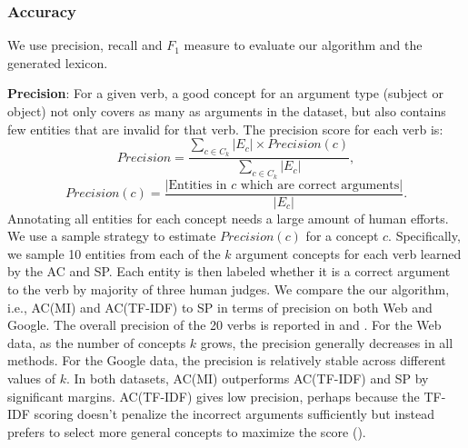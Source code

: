 \subsubsection{Accuracy}
We use precision, recall and $F_1$ measure to evaluate our
algorithm and the generated lexicon.

\textbf{Precision}:
For a given verb, a good concept for an argument type
(subject or object) not only covers as many as arguments in the dataset,
but also contains few entities that are invalid for that verb.
The precision score for each verb is:
\[
Precision = \frac{\sum_{c \in C_k}|E_c|\times Precision(c)}
{\sum_{c \in C_k}{|E_c|}},
\]
\[
Precision(c)=\frac{|\mbox{Entities in~} c
\mbox{~which are correct arguments}|}{|E_c|}.
\]
Annotating all entities for each concept needs a large
amount of human efforts. We use a sample strategy to
estimate $Precision(c)$ for a concept $c$. Specifically,
we sample 10 entities from each of the $k$ argument concepts
for each verb learned by the AC and SP.
Each entity is then labeled whether it is a correct argument to the
verb by majority of three human judges.
We compare the our algorithm, i.e., AC(MI) and AC(TF-IDF) to
SP in terms of precision on both Web and Google.
The overall precision of the 20 verbs
is reported in  and .
For the Web data, as the number of concepts $k$ grows, the precision generally
decreases in all methods. For the Google data, the precision is relatively
stable across different values of $k$.
In both datasets, AC(MI) outperforms AC(TF-IDF) and
SP by significant margins. AC(TF-IDF) gives low precision,
perhaps because the TF-IDF scoring doesn't penalize the incorrect arguments
sufficiently but instead prefers to select more general
concepts to maximize the score ().

